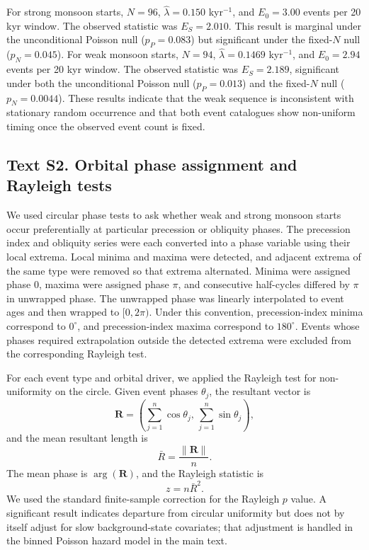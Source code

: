 \documentclass[11pt]{article}
\begin{document}
For strong monsoon starts, \(N=96\), \(\hat{\lambda}=0.150\) kyr\(^{-1}\), and \(E_0=3.00\) events per 20 kyr window. The observed statistic was \(E_S=2.010\). This result is marginal under the unconditional Poisson null (\(p_P=0.083\)) but significant under the fixed-\(N\) null (\(p_N=0.045\)). For weak monsoon starts, \(N=94\), \(\hat{\lambda}=0.1469\) kyr\(^{-1}\), and \(E_0=2.94\) events per 20 kyr window. The observed statistic was \(E_S=2.189\), significant under both the unconditional Poisson null (\(p_P=0.013\)) and the fixed-\(N\) null (\(p_N=0.0044\)). These results indicate that the weak sequence is inconsistent with stationary random occurrence and that both event catalogues show non-uniform timing once the observed event count is fixed.

\subsection*{Text S2. Orbital phase assignment and Rayleigh tests}

We used circular phase tests to ask whether weak and strong monsoon starts occur preferentially at particular precession or obliquity phases. The precession index and obliquity series were each converted into a phase variable using their local extrema. Local minima and maxima were detected, and adjacent extrema of the same type were removed so that extrema alternated. Minima were assigned phase \(0\), maxima were assigned phase \(\pi\), and consecutive half-cycles differed by \(\pi\) in unwrapped phase. The unwrapped phase was linearly interpolated to event ages and then wrapped to \([0,2\pi)\). Under this convention, precession-index minima correspond to \(0^\circ\), and precession-index maxima correspond to \(180^\circ\). Events whose phases required extrapolation outside the detected extrema were excluded from the corresponding Rayleigh test.

For each event type and orbital driver, we applied the Rayleigh test for non-uniformity on the circle. Given event phases \(\theta_j\), the resultant vector is
\[
\mathbf{R} =
\left(
\sum_{j=1}^{n}\cos\theta_j,\,
\sum_{j=1}^{n}\sin\theta_j
\right),
\]
and the mean resultant length is
\[
\bar{R} = \frac{\|\mathbf{R}\|}{n}.
\]
The mean phase is \(\arg(\mathbf{R})\), and the Rayleigh statistic is
\[
z = n\bar{R}^{2}.
\]
We used the standard finite-sample correction for the Rayleigh \(p\) value. A significant result indicates departure from circular uniformity but does not by itself adjust for slow background-state covariates; that adjustment is handled in the binned Poisson hazard model in the main text.
\end{document}
